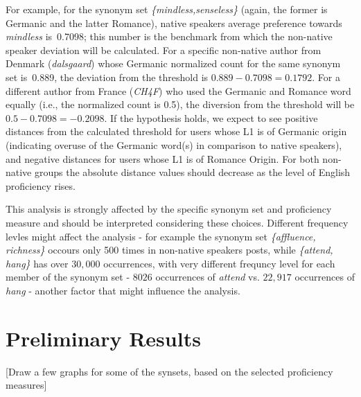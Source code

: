 \documentclass[11pt]{article}
\newcommand{\textnl}{\textsl}
\begin{document}
For example, for the synonym set \textnl{\{mindless,senseless\}} (again, the former is Germanic and the latter Romance), native speakers average preference towards \textnl{mindless} is~0.7098; this number is the benchmark from which the non-native speaker deviation will be calculated. For a specific non-native author from Denmark (\textit{dalsgaard}) whose Germanic normalized count for the same synonym set is~0.889, the deviation from the threshold is $0.889-0.7098 = 0.1792$. For a different author from France (\textit{CH4F}) who used the Germanic and Romance word equally (i.e., the normalized count is 0.5), the diversion from the threshold will be $0.5 - 0.7098  = -0.2098$. 
If the hypothesis holds, we expect to see positive distances from the calculated threshold for users whose L1 is of Germanic origin (indicating overuse of the Germanic word(s) in comparison to native speakers), and negative distances for users whose L1 is of Romance Origin. For both non-native groups the absolute distance values should decrease as the level of English proficiency rises. 

This analysis is strongly affected by the specific synonym set and proficiency measure and should be interpreted considering these choices. Different frequency levles might affect the analysis - for example the synonym set \textnl{\{affluence, richness\}} occours only 500 times in non-native speakers posts, while \textnl{\{attend, hang\}} has over $30,000$ occurrences, with very different frequncy level for each member of the synonym set - $8026$ occurrences of \textnl{attend} vs. $22,917$ occurrences of \textnl{hang} - another factor that might influence the analysis. 


\section{Preliminary Results}

[Draw a few graphs for some of the synsets, based on the selected proficiency measures]




\end{document}

